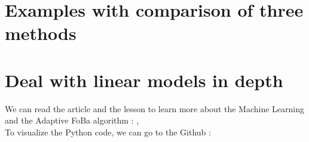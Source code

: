 \documentclass{article}
\begin{document}

\section{Examples with comparison of three methods}


\section{Deal with linear models in depth}
\label{sec:pour_aller_plus_loin_sur_ce_theme}

We can read the article and the lesson to learn more about the Machine Learning and the Adaptive FoBa algorithm :
\cite{Article}, \cite{Teaching}\\
To visualize the Python code, we can go to the Github :
\cite{code}




\end{document}
